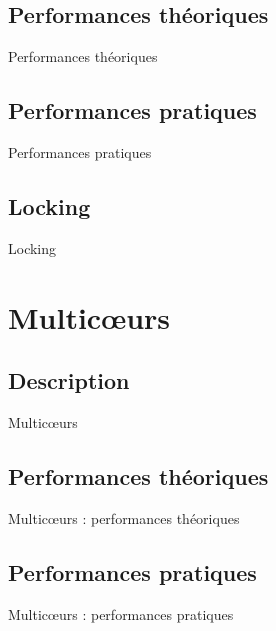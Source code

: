 \documentclass[9.5pt]{beamer}
\begin{document}
	\subsection{Performances théoriques}
		\begin{frame}{Performances théoriques}
			
		\end{frame}

	\subsection{Performances pratiques}
		\begin{frame}{Performances pratiques}

		\end{frame}

	\subsection{Locking}
		\begin{frame}{Locking}

		\end{frame}

\section{Multic\oe{}urs}
		\subsection{Description}
		\begin{frame}{Multic\oe{}urs}

		\end{frame}

	\subsection{Performances théoriques}
		\begin{frame}{Multic\oe{}urs : performances théoriques}

		\end{frame}

	\subsection{Performances pratiques}
		\begin{frame}{Multic\oe{}urs : performances pratiques}

		\end{frame}
\end{document}
